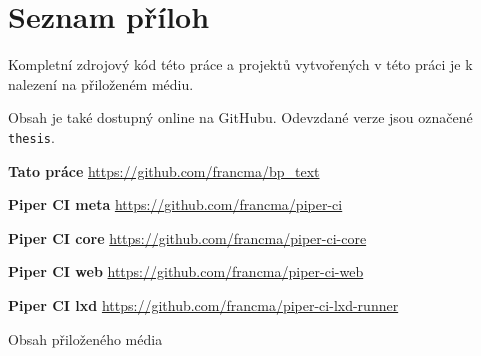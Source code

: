 \chapter{Seznam příloh}

Kompletní zdrojový kód této práce a projektů vytvořených v této práci je k nalezení na přiloženém médiu.

Obsah je také dostupný online na GitHubu. 
Odevzdané verze jsou označené \texttt{thesis}.

\noindent \textbf{Tato práce} \hfill
\url{https://github.com/francma/bp_text}

\noindent \textbf{Piper CI meta} \hfill
\url{https://github.com/francma/piper-ci}

\noindent \textbf{Piper CI core} \hfill
\url{https://github.com/francma/piper-ci-core}
    
\noindent \textbf{Piper CI web} \hfill
\url{https://github.com/francma/piper-ci-web}

\noindent \textbf{Piper CI lxd} \hfill
\url{https://github.com/francma/piper-ci-lxd-runner}

\vfill

\begin{dirfigure}%
\caption{Obsah přiloženého média}
\end{dirfigure}